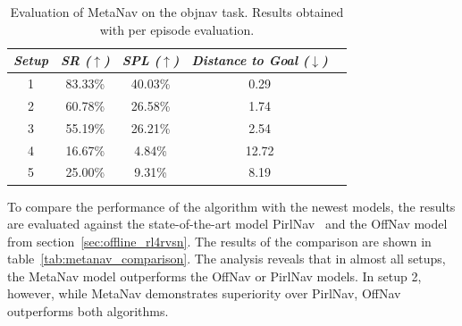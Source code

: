 \begin{table}
    \centering
    \begin{tabular}{c|cccc}
        \toprule
        \textit{\textbf{Setup}} & \textit{\textbf{SR ($\uparrow$)}} & \textbf{\textit{SPL ($\uparrow$)}} & \textit{\textbf{Distance to Goal ($\downarrow$)}} \\ \midrule
        1                       & 83.33\%                           & 40.03\%                            & 0.29                                              \\
        2                       & 60.78\%                           & 26.58\%                            & 1.74                                              \\
        3                       & 55.19\%                           & 26.21\%                            & 2.54                                              \\
        4                       & 16.67\%                           & 4.84\%                             & 12.72                                             \\
        5                       & 25.00\%                           & 9.31\%                             & 8.19                                              \\
    \end{tabular}
    \caption{Evaluation of MetaNav on the \acrshort{objnav} task. Results obtained with per episode evaluation.}
    \label{tab:metanav_episode}
\end{table}

To compare the performance of the algorithm with the newest models, the results are evaluated against the state-of-the-art model PirlNav~\cite{ramrakhya2023} and the OffNav model from section~\ref{sec:offline_rl4rvsn}.
The results of the comparison are shown in table~\ref{tab:metanav_comparison}.
The analysis reveals that in almost all setups, the MetaNav model outperforms the OffNav or PirlNav models.
In setup 2, however, while MetaNav demonstrates superiority over PirlNav, OffNav outperforms both algorithms.

